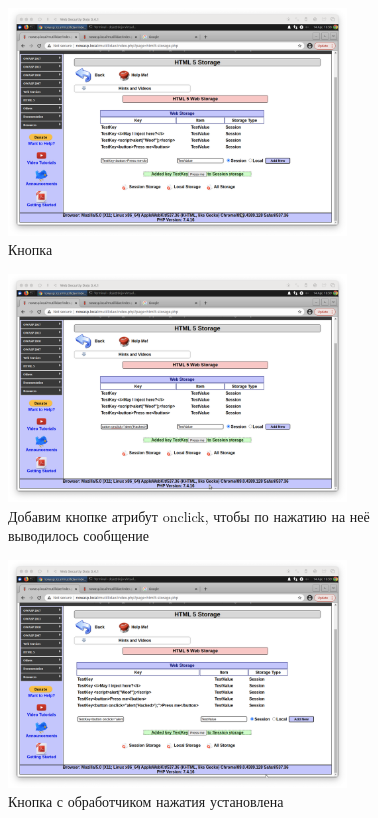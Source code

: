 \documentclass[a4paper]{article}
\begin{document}
  \begin{figure}[H]
    \centering
    \includegraphics[width=0.8\textwidth]{step_00041}
    \caption{Кнопка}
  \end{figure}

  \begin{figure}[H]
    \centering
    \includegraphics[width=0.8\textwidth]{step_00042}
    \caption{Добавим кнопке атрибут onclick, чтобы по нажатию на неё выводилось сообщение}
  \end{figure}

  \begin{figure}[H]
    \centering
    \includegraphics[width=0.8\textwidth]{step_00043}
    \caption{Кнопка с обработчиком нажатия установлена}
  \end{figure}
\end{document}
